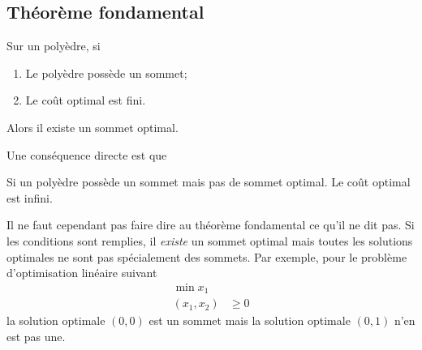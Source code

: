 \subsection{Théorème fondamental}
\begin{mytheo}
  Sur un polyèdre, si
  \begin{enumerate}
    \item Le polyèdre possède un sommet;
    \item Le coût optimal est fini.
  \end{enumerate}
  Alors il existe un sommet optimal.
\end{mytheo}
Une conséquence directe est que
\begin{mycorr}
  Si un polyèdre possède un sommet mais pas de sommet optimal.
  Le coût optimal est infini.
\end{mycorr}
\begin{myrem}
  Il ne faut cependant pas faire dire au
  théorème fondamental ce qu'il ne dit pas.
  Si les conditions sont remplies, il \emph{existe} un sommet optimal mais
  toutes les solutions optimales ne sont pas spécialement des sommets.
  Par exemple, pour le problème d'optimisation linéaire suivant
  \begin{align*}
    \min x_1\\
    (x_1,x_2) & \geq 0
  \end{align*}
  la solution optimale $(0,0)$ est un sommet mais la solution optimale $(0,1)$
  n'en est pas une.
\end{myrem}

